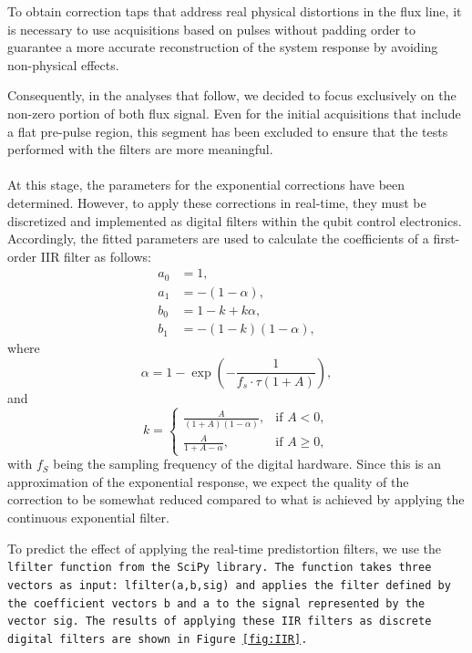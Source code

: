 To obtain correction taps that address real physical distortions in the flux line, it is necessary to use acquisitions based on pulses without padding order to guarantee a more accurate reconstruction of the system response by avoiding non-physical effects.

Consequently, in the analyses that follow, we decided to focus exclusively on the non-zero portion of both flux signal. 
Even for the initial acquisitions that include a flat pre-pulse region, this segment has been excluded to ensure that the tests performed with the filters are more meaningful.

\paragraph{}
At this stage, the parameters for the exponential corrections have been determined. However, to apply these corrections in real-time, they must be discretized and implemented as digital filters within the qubit control electronics. 
Accordingly, the fitted parameters are used to calculate the coefficients of a first-order IIR filter as follows:
\begin{align}
    a_0 &= 1, \\
    a_1 &= -(1 - \alpha), \\
    b_0 &= 1 - k + k \alpha, \\
    b_1 &= -(1 - k)(1 - \alpha),
\end{align}
where 
\begin{equation}
\alpha = 1 - \exp\left(-\frac{1}{f_s \cdot \tau (1 + A)}\right),
\end{equation}
and
\begin{equation}
    k =
    \begin{cases}
    \frac{A}{(1 + A)(1 - \alpha)}, & \text{if } A < 0, \\
    \frac{A}{1 + A - \alpha}, & \text{if } A \geq 0,
    \end{cases}
\end{equation}
with $f_S$ being the sampling frequency of the digital hardware.
Since this is an approximation of the exponential response, we expect the quality of the correction to be somewhat reduced compared to what is achieved by applying the continuous exponential filter.

To predict the effect of applying the real-time predistortion filters, we use the \tt{lfilter} function from the \tt{SciPy} library. 
The function takes three vectors as input: \tt{lfilter(a,b,sig)} and applies the filter defined by the coefficient vectors \tt{b} and \tt{a} to the signal represented by the vector \tt{sig}. 
The results of applying these IIR filters as discrete digital filters are shown in Figure \ref{fig:IIR}.

